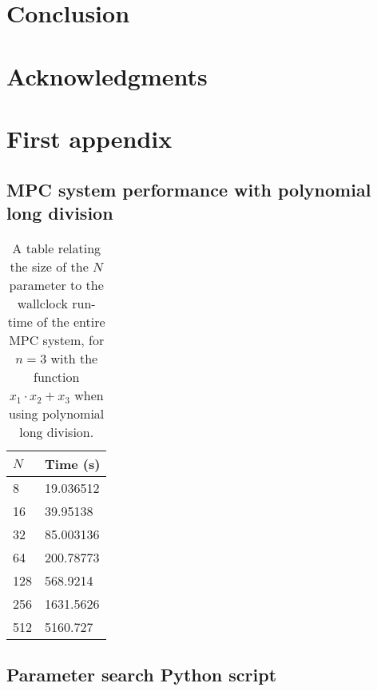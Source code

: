 \documentclass[11pt,openright]{report}
\theoremstyle{definition}
\begin{document}



\chapter{Conclusion}
\label{ch:conclusion}



\chapter*{Acknowledgments}




\cleardoublepage
{}




\cleardoublepage
\appendix
\chapter{First appendix}

\section{MPC system performance with polynomial long division}

\begin{table}[h]
  \centering
  \begin{tabular}{l|l}
      $N$  & Time (s)   \\ 
      \hline
      8   & 19.036512 \\
      16  & 39.95138 \\
      32  & 85.003136 \\
      64  & 200.78773 \\
      128 & 568.9214 \\
      256 & 1631.5626 \\
      512 & 5160.727
  \end{tabular}
  \caption{A table relating the size of the $N$ parameter to the wallclock run-time of the entire MPC system, for $n = 3$ with the function $x_1 \cdot x_2 + x_3$ when using polynomial long division.}
  \label{tab:polynomial-long-division-performance}
\end{table}

\newpage
\section{Parameter search Python script} \label{appendix:param-search}


\end{document}
